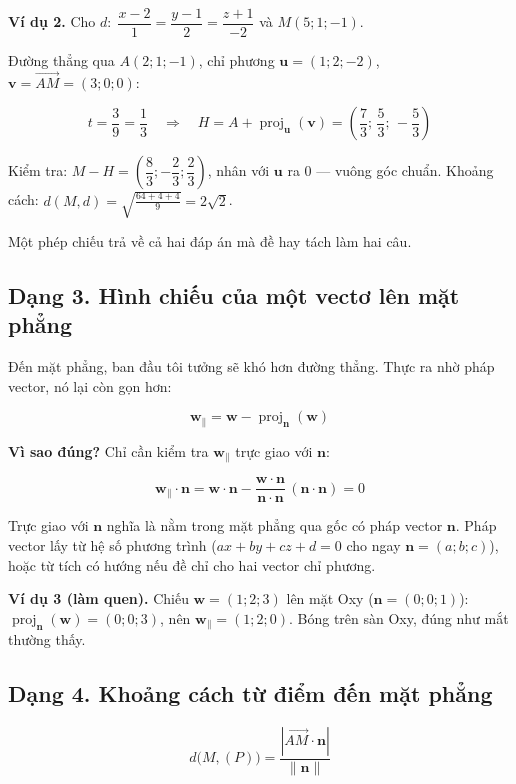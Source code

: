 \documentclass[12pt,a4paper]{article}
\begin{document}
\textbf{Ví dụ 2.} Cho $d:\;\dfrac{x-2}{1}=\dfrac{y-1}{2}=\dfrac{z+1}{-2}$ và $M(5;1;-1)$.

Đường thẳng qua $A(2;1;-1)$, chỉ phương $\mathbf{u}=(1;2;-2)$, $\mathbf{v}=\overrightarrow{AM}=(3;0;0)$:

$$
t = \frac{3}{9} = \frac{1}{3}
\quad\Longrightarrow\quad
H = A + \operatorname{proj}_{\mathbf{u}}(\mathbf{v}) = \left(\frac{7}{3};\,\frac{5}{3};\,-\frac{5}{3}\right)
$$

Kiểm tra: $M-H = \left(\dfrac{8}{3};-\dfrac{2}{3};\dfrac{2}{3}\right)$, nhân với $\mathbf{u}$ ra $0$ --- vuông góc chuẩn. Khoảng cách: $d(M,d)=\sqrt{\frac{64+4+4}{9}}=2\sqrt{2}$.

Một phép chiếu trả về cả hai đáp án mà đề hay tách làm hai câu.

\subsection*{Dạng 3. Hình chiếu của một vectơ lên mặt phẳng}

Đến mặt phẳng, ban đầu tôi tưởng sẽ khó hơn đường thẳng. Thực ra nhờ pháp vector, nó lại còn gọn hơn:

$$
\boxed{\;\mathbf{w}_{\parallel} = \mathbf{w} - \operatorname{proj}_{\mathbf{n}}(\mathbf{w})\;}
$$

\textbf{Vì sao đúng?} Chỉ cần kiểm tra $\mathbf{w}_{\parallel}$ trực giao với $\mathbf{n}$:

$$
\mathbf{w}_{\parallel}\cdot\mathbf{n}
= \mathbf{w}\cdot\mathbf{n} - \frac{\mathbf{w}\cdot\mathbf{n}}{\mathbf{n}\cdot\mathbf{n}}\,(\mathbf{n}\cdot\mathbf{n}) = 0
$$

Trực giao với $\mathbf{n}$ nghĩa là nằm trong mặt phẳng qua gốc có pháp vector $\mathbf{n}$. Pháp vector lấy từ hệ số phương trình ($ax+by+cz+d=0$ cho ngay $\mathbf{n}=(a;b;c)$), hoặc từ tích có hướng nếu đề chỉ cho hai vector chỉ phương.

\textbf{Ví dụ 3 (làm quen).} Chiếu $\mathbf{w}=(1;2;3)$ lên mặt Oxy ($\mathbf{n}=(0;0;1)$): $\operatorname{proj}_{\mathbf{n}}(\mathbf{w})=(0;0;3)$, nên $\mathbf{w}_{\parallel}=(1;2;0)$. Bóng trên sàn Oxy, đúng như mắt thường thấy.

\subsection*{Dạng 4. Khoảng cách từ điểm đến mặt phẳng}

$$
d\bigl(M,(P)\bigr) = \frac{|\overrightarrow{AM}\cdot\mathbf{n}|}{\|\mathbf{n}\|}
$$
\end{document}
